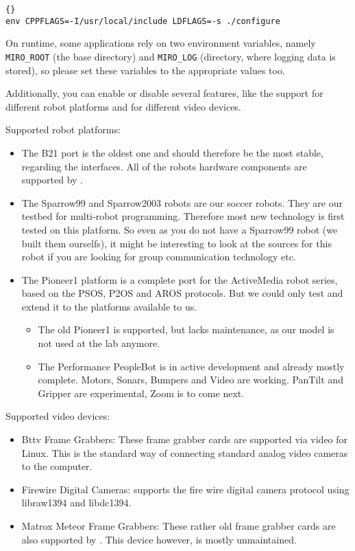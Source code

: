 \begin{lstlisting}[frame=tb]{}
env CPPFLAGS=-I/usr/local/include LDFLAGS=-s ./configure
\end{lstlisting}

On runtime, some applications rely on two environment variables,
namely \texttt{MIRO\_ROOT} (the base directory) and \texttt{MIRO\_LOG}
(directory, where logging data is stored), so please set these
variables to the appropriate values too.

Additionally, you can enable or disable several features, like the
support for different robot platforms and for different video devices.

Supported robot platforms:
\begin{itemize}
\item The B21 port is the oldest one and should therefore be the most
  stable, regarding the interfaces. All of the robots hardware
  components are supported by \miro.
\item The Sparrow99 and Sparrow2003 robots are our soccer robots. They
  are our testbed for multi-robot programming. Therefore most new
  technology is first tested on this platform. So even as you do not
  have a Sparrow99 robot (we built them ourselfs), it might be
  interesting to look at the sources for this robot if you are looking
  for group communication technology etc.
\item The Pioneer1 platform is a complete port for the ActiveMedia
  robot series, based on the PSOS, P2OS and AROS protocols. But we
  could only test and extend it to the platforms available to us.
  \begin{itemize}
  \item The old Pioneer1 is supported, but lacks maintenance, as our
    model is not used at the lab anymore.
  \item The Performance PeopleBot is in active development and already
    mostly complete. Motors, Sonars, Bumpers and Video are working.
    PanTilt and Gripper are experimental, Zoom is to come next.
  \end{itemize}
\end{itemize}

Supported video devices:
\begin{itemize}
\item Bttv Frame Grabbers: These frame grabber cards are supported via
  video for Linux.  This is the standard way of connecting standard
  analog video cameras to the computer.
\item Firewire Digital Cameras: \miro supports the fire wire digital
  camera protocol using libraw1394 and libdc1394.
\item Matrox Meteor Frame Grabbers: These rather old frame grabber
  cards are also supported by \miro. This device however, is mostly
  unmaintained.
\end{itemize}

